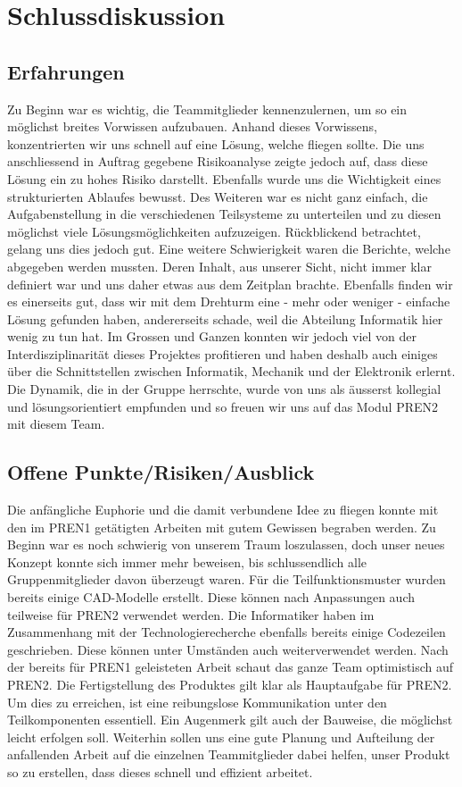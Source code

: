 \section{Schlussdiskussion}

\subsection{Erfahrungen}

Zu Beginn war es wichtig, die Teammitglieder kennenzulernen, um so ein 
möglichst breites Vorwissen aufzubauen. Anhand dieses Vorwissens, 
konzentrierten wir uns schnell auf eine Lösung, welche fliegen sollte. Die uns 
anschliessend in Auftrag gegebene Risikoanalyse zeigte jedoch auf, dass diese 
Lösung ein zu hohes Risiko darstellt. Ebenfalls wurde uns die 
Wichtigkeit eines strukturierten Ablaufes bewusst. Des Weiteren war es nicht ganz  
einfach, die Aufgabenstellung in die verschiedenen Teilsysteme zu unterteilen  
und zu diesen möglichst viele Lösungsmöglichkeiten aufzuzeigen. 
Rückblickend betrachtet, gelang uns dies jedoch gut. Eine weitere 
Schwierigkeit waren die Berichte, welche abgegeben werden mussten. 
Deren Inhalt, aus unserer Sicht, nicht immer klar definiert war und uns daher 
etwas aus dem Zeitplan brachte.
Ebenfalls finden wir es einerseits gut, dass wir mit dem Drehturm eine - mehr 
oder weniger - einfache Lösung gefunden haben, andererseits schade, weil die 
Abteilung Informatik hier wenig zu tun hat. Im Grossen und Ganzen konnten wir 
jedoch viel von der Interdisziplinarität dieses Projektes profitieren und 
haben deshalb auch einiges über die Schnittstellen zwischen Informatik, 
Mechanik und der Elektronik erlernt. Die Dynamik, die in der Gruppe herrschte, 
wurde von uns als äusserst kollegial und lösungsorientiert empfunden und so 
freuen wir uns auf das Modul PREN2 mit diesem Team.


\subsection{Offene Punkte/Risiken/Ausblick}

Die anfängliche Euphorie und die damit verbundene Idee zu fliegen konnte mit 
den im PREN1 getätigten Arbeiten mit gutem Gewissen begraben werden. Zu Beginn 
war es noch schwierig von unserem Traum loszulassen, doch unser neues Konzept 
konnte sich immer mehr beweisen, bis schlussendlich alle Gruppenmitglieder 
davon überzeugt waren.
Für die Teilfunktionsmuster wurden bereits einige CAD-Modelle erstellt. Diese 
können nach Anpassungen auch teilweise für PREN2 verwendet werden. Die 
Informatiker haben im Zusammenhang mit der Technologierecherche ebenfalls 
bereits einige Codezeilen geschrieben. Diese können unter Umständen auch 
weiterverwendet werden.
Nach der bereits für PREN1 geleisteten Arbeit schaut das ganze Team 
optimistisch auf PREN2. Die Fertigstellung des Produktes gilt klar als 
Hauptaufgabe für PREN2. Um dies zu erreichen, ist eine reibungslose 
Kommunikation unter den Teilkomponenten essentiell. Ein Augenmerk gilt auch 
der Bauweise, die möglichst leicht erfolgen soll. Weiterhin sollen uns eine 
gute Planung und Aufteilung der anfallenden Arbeit auf die einzelnen 
Teammitglieder dabei helfen, unser Produkt so zu erstellen, dass dieses 
schnell und effizient arbeitet.

